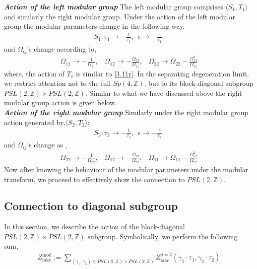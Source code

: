 \documentclass[12 pt]{article}
\begin{document}
\noindent
\textbf{\textit{Action of the left modular group}}
The left modular group comprises $\langle S_1,T_1\rangle$ and similarly the right modular group.
Under the action of the left modular group the modular parameters change in the following way,
\begin{align}
    S_1:\tau_1\to-\frac{1}{\tau_1},\,\,\,\epsilon\to-\frac{\epsilon }{\tau_1}.
\end{align}
and $\Omega_{ij}$'s change according to,
\begin{align}
    \Omega_{11}\to -\frac{1}{\Omega_{11}},\,\,\,\,\,
    \Omega_{12}\to -\frac{\Omega_{12}}{\Omega_{11}},\,\,\,\,\,
    \Omega_{22}\to \Omega_{22}-\frac{\Omega_{12}^2}{\Omega_{11}}
\end{align}
 where, the action of $T_1$ is similar to \eqref{3.11r}. In the separating degeneration limit, we restrict attention not to the full $Sp(4,\mathbb{Z})$, but to its block-diagonal subgroup $PSL(2,\mathbb{Z})\times PSL(2,\mathbb{Z})$. Similar to what we have discussed above the right modular group action is given below.\\
 \noindent
\textbf{\textit{Action of the right modular group}}
 Similarly under the right modular group action generated by,$\langle S_2,T_2\rangle$:
\begin{align}
    S_2:\tau_2\to-\frac{1}{\tau_2},\,\,\,\epsilon\to-\frac{\epsilon }{\tau_2}.
\end{align}
and $\Omega_{ij}$'s change as \cite{Tuite:1999id},
\begin{align}
    \Omega_{22}\to -\frac{1}{\Omega_{22}},\,\,\,\,\,
    \Omega_{12}\to -\frac{\Omega_{12}}{\Omega_{22}},\,\,\,\,\,
    \Omega_{11}\to \Omega_{11}-\frac{\Omega_{12}^2}{\Omega_{22}}
\end{align}
Now after knowing the behaviour of the modular parameters under the modular transform, we proceed to effectively show the connection to $PSL(2,\mathbb{Z})$.\\

\noindent
\subsection{{Connection to diagonal subgroup}}
In this section, we describe the action of the block-diagonal $PSL(2,\mathbb{Z})\times PSL(2,\mathbb{Z})$ subgroup. Symbolically, we perform the following sum,
\begin{align}
Z_{\text{fake}}^{\text{mod}}:=\sum_{(\gamma_1,\gamma_2)\in PSL(2,\mathbb{Z})\times PSL(2,\mathbb{Z})}Z_{\text{fake}}^{g=2}(\gamma_1\cdot\tau_1,\gamma_2\cdot\tau_2)
\end{align}
\end{document}
